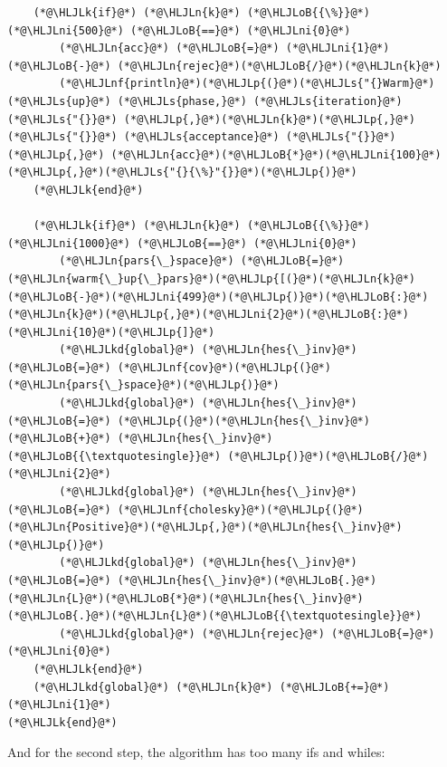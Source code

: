 \documentclass[12pt,a4paper]{article}
\newcommand{\HLJLk}[1]{\textcolor[RGB]{148,91,176}{\textbf{#1}}}
\newcommand{\HLJLkd}[1]{\textcolor[RGB]{214,102,97}{\textit{#1}}}
\newcommand{\HLJLn}[1]{#1}
\newcommand{\HLJLnf}[1]{\textcolor[RGB]{66,102,213}{#1}}
\newcommand{\HLJLs}[1]{\textcolor[RGB]{201,61,57}{#1}}
\newcommand{\HLJLni}[1]{\textcolor[RGB]{59,151,46}{#1}}
\newcommand{\HLJLoB}[1]{\textcolor[RGB]{102,102,102}{\textbf{#1}}}
\newcommand{\HLJLp}[1]{#1}
\begin{document}
\begin{lstlisting}
    (*@\HLJLk{if}@*) (*@\HLJLn{k}@*) (*@\HLJLoB{{\%}}@*) (*@\HLJLni{500}@*) (*@\HLJLoB{==}@*) (*@\HLJLni{0}@*)
        (*@\HLJLn{acc}@*) (*@\HLJLoB{=}@*) (*@\HLJLni{1}@*) (*@\HLJLoB{-}@*) (*@\HLJLn{rejec}@*)(*@\HLJLoB{/}@*)(*@\HLJLn{k}@*)
        (*@\HLJLnf{println}@*)(*@\HLJLp{(}@*)(*@\HLJLs{"{}Warm}@*) (*@\HLJLs{up}@*) (*@\HLJLs{phase,}@*) (*@\HLJLs{iteration}@*) (*@\HLJLs{"{}}@*) (*@\HLJLp{,}@*)(*@\HLJLn{k}@*)(*@\HLJLp{,}@*) (*@\HLJLs{"{}}@*) (*@\HLJLs{acceptance}@*) (*@\HLJLs{"{}}@*)(*@\HLJLp{,}@*) (*@\HLJLn{acc}@*)(*@\HLJLoB{*}@*)(*@\HLJLni{100}@*)(*@\HLJLp{,}@*)(*@\HLJLs{"{}{\%}"{}}@*)(*@\HLJLp{)}@*)
    (*@\HLJLk{end}@*)

    (*@\HLJLk{if}@*) (*@\HLJLn{k}@*) (*@\HLJLoB{{\%}}@*) (*@\HLJLni{1000}@*) (*@\HLJLoB{==}@*) (*@\HLJLni{0}@*)
        (*@\HLJLn{pars{\_}space}@*) (*@\HLJLoB{=}@*) (*@\HLJLn{warm{\_}up{\_}pars}@*)(*@\HLJLp{[(}@*)(*@\HLJLn{k}@*)(*@\HLJLoB{-}@*)(*@\HLJLni{499}@*)(*@\HLJLp{)}@*)(*@\HLJLoB{:}@*)(*@\HLJLn{k}@*)(*@\HLJLp{,}@*)(*@\HLJLni{2}@*)(*@\HLJLoB{:}@*)(*@\HLJLni{10}@*)(*@\HLJLp{]}@*)
        (*@\HLJLkd{global}@*) (*@\HLJLn{hes{\_}inv}@*) (*@\HLJLoB{=}@*) (*@\HLJLnf{cov}@*)(*@\HLJLp{(}@*)(*@\HLJLn{pars{\_}space}@*)(*@\HLJLp{)}@*)
        (*@\HLJLkd{global}@*) (*@\HLJLn{hes{\_}inv}@*) (*@\HLJLoB{=}@*) (*@\HLJLp{(}@*)(*@\HLJLn{hes{\_}inv}@*) (*@\HLJLoB{+}@*) (*@\HLJLn{hes{\_}inv}@*)(*@\HLJLoB{{\textquotesingle}}@*) (*@\HLJLp{)}@*)(*@\HLJLoB{/}@*)(*@\HLJLni{2}@*)
        (*@\HLJLkd{global}@*) (*@\HLJLn{hes{\_}inv}@*) (*@\HLJLoB{=}@*) (*@\HLJLnf{cholesky}@*)(*@\HLJLp{(}@*)(*@\HLJLn{Positive}@*)(*@\HLJLp{,}@*)(*@\HLJLn{hes{\_}inv}@*)(*@\HLJLp{)}@*)
        (*@\HLJLkd{global}@*) (*@\HLJLn{hes{\_}inv}@*) (*@\HLJLoB{=}@*) (*@\HLJLn{hes{\_}inv}@*)(*@\HLJLoB{.}@*)(*@\HLJLn{L}@*)(*@\HLJLoB{*}@*)(*@\HLJLn{hes{\_}inv}@*)(*@\HLJLoB{.}@*)(*@\HLJLn{L}@*)(*@\HLJLoB{{\textquotesingle}}@*)
        (*@\HLJLkd{global}@*) (*@\HLJLn{rejec}@*) (*@\HLJLoB{=}@*) (*@\HLJLni{0}@*)
    (*@\HLJLk{end}@*)
    (*@\HLJLkd{global}@*) (*@\HLJLn{k}@*) (*@\HLJLoB{+=}@*) (*@\HLJLni{1}@*)
(*@\HLJLk{end}@*)
\end{lstlisting}

And for the second step, the algorithm has too many ifs and whiles:
\end{document}
